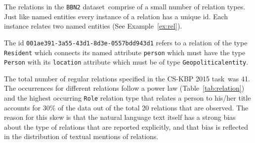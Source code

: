 \documentclass[paper=a4,fontsize=11pt]{scrartcl}
\newcommand{\Tabref}[1]{Table~\ref{#1}}
\newcommand{\Exref}[1]{Example~\ref{#1}}
\numberwithin{equation}{section}    %
\numberwithin{figure}{section}      %
\numberwithin{table}{section}       %
\newcommand{\dataset}[0]{\texttt{BBN2} dataset\ }
\newcommand{\task}{CS-KBP 2015 task\ }
\begin{document}
The relations in the \dataset comprise of a small number of relation types.
Just like named entities every instance of a relation has a unique id.
Each instance relates two named entities (See \Exref{ex:rel}).
\begin{example}\label{ex:rel}
  The id \texttt{001ae391-3a55-43d1-8d3e-0557bdd943d1} refers to a relation of the
type \texttt{Resident} which connects its named attribute \texttt{person}
which must have the type \texttt{Person}
with its \texttt{location} attribute which must be of type
\texttt{Geopoliticalentity}.
\end{example}
The total number of regular relations specified in the \task was 41.
The occurrences for different relations follow a power law
(\Tabref{tab:relation}) and the highest occurring \texttt{Role} relation type
that relates a person to his/her title accounts for $30\%$ of the data
out of the total 20 relations that are observed.
The reason for this skew is that the
natural language text itself has a strong bias about the type of relations that are
reported explicitly, and that bias is reflected in the distribution of textual mentions
of relations.
\end{document}
